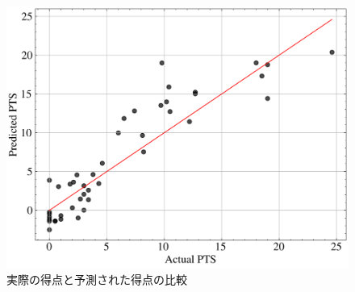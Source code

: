\begin{figure}
    \centering
    \includegraphics[width=0.8\linewidth]{src/figures/nba-regression/actual-vs-predicted-PTS-2.png}
    \caption{実際の得点と予測された得点の比較}\label{fig:actual-vs-predicted-PTS-2}
\end{figure}

